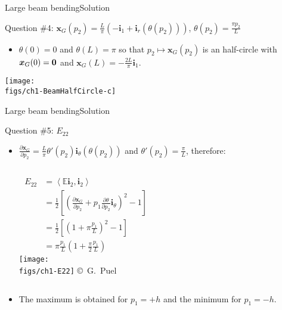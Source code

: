 \documentclass{beamer}
\newcommand{\demi}{\frac{1}{2}}
\newcommand{\xj}{x}
\newcommand{\xv}{{\boldsymbol\xj}}
\renewcommand{\ij}{i}
\newcommand{\pj}{p}
\newcommand{\iv}{{\boldsymbol\ij}}
\newcommand{\GreenLj}{E}
\newcommand{\GreenL}{{\mathbb\GreenLj}}
\newcommand{\bzero}{{\bf 0}}
\newcommand{\scal}[1]{\left\langle{#1}\right\rangle}
\begin{document}
\begin{frame}{Large beam bending}{Solution}

\begin{exampleblock}{Question \#4: $\xv_G(\pj_2)=\frac{L}{\pi}(-\iv_1+\iv_r(\theta(\pj_2)))$, $\theta(\pj_2)=\frac{\pi\pj_2}{L}$}
\begin{itemize}
\item $\theta(0)=0$ and $\theta(L)=\pi$ so that $\pj_2\mapsto\xv_G(\pj_2)$ is an half-circle with $\xv_G(0)=\bzero$ and $\xv_G(L)=-\frac{2L}{\pi}\iv_1$. 
\end{itemize}
\centering\texttt{[image: \\figs/ch1-BeamHalfCircle-c]}
\end{exampleblock}

\end{frame}

\begin{frame}{Large beam bending}{Solution}

\begin{exampleblock}{Question \#5: $\GreenLj_{22}$}
\begin{itemize}
\item $\frac{\partial\xv_G}{\partial\pj_2}=\frac{L}{\pi}\theta'(\pj_2)\iv_\theta(\theta(\pj_2))$ and $\theta'(\pj_2)=\frac{\pi}{L}$, therefore:
\begin{columns}
{\scriptsize
\begin{displaymath}
\begin{split}
\;\GreenLj_{22} &=\scal{\GreenL\iv_2,\iv_2} \\
&=\demi\left[\left(\frac{\partial\xv_G}{\partial\pj_2}+\pj_1\frac{\partial\theta}{\partial\pj_2}\iv_\theta\right)^2-1\right] \\
&=\demi\left[\left(1+\pi\frac{\pj_1}{L}\right)^2-1\right] \\
&=\pi\frac{\pj_1}{L}\left(1+\frac{\pi}{2}\frac{\pj_1}{L}\right)
\end{split}
\end{displaymath}}
\centering\texttt{[image: \\figs/ch1-E22]}
\vskip-5pt{\hspace{4.3truecm}\mbox{\tiny{\copyright\ G. Puel}}}
\end{columns}
\item The maximum is obtained for $\pj_1=+h$ and the minimum for $\pj_1=-h$.
\end{itemize}
\end{exampleblock}

\end{frame}
\end{document}
